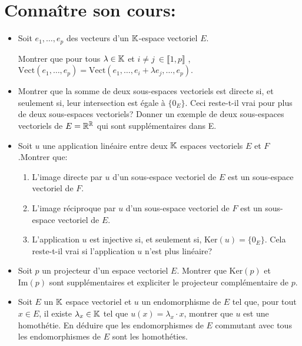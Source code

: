 \documentclass[a4paper,11pt]{article}
\theoremstyle{definition}
\begin{document}
 
 
 
 
	

\noindent{}

\smallskip
\section*{Connaître son cours:}
\begin{itemize}[$\bullet$]
	\item Soit $e_1 , \dots , e_p$ des vecteurs d’un $\mathbb{K}$-espace vectoriel $E $. 
	
	Montrer que pour tous $\lambda \in \mathbb{K}$ et $i\neq j \ \in \llbracket1, p\rrbracket$ , $\text{Vect}(e_1 ,\dots , e_p) = \text{Vect}(e_1 ,\dots , e_i + \lambda e_j , \dots, e_p) $.
	\item Montrer que la somme de deux sous-espaces vectoriels est directe si, et seulement si, leur intersection est égale à $\{0_E\} $. Ceci reste-t-il vrai pour plus de deux sous-espaces vectoriels? Donner un exemple de deux sous-espaces vectoriels de $E=\mathbb{R}^{\mathbb{R}}$ qui sont supplémentaires dans E. 
	\item Soit $u$ une application linéaire entre deux $\mathbb{K}$ espaces vectoriels $E$ et $F$.Montrer que:\begin{enumerate}[$\square$]
		\item L'image directe par $u$ d’un sous-espace vectoriel de $E$ est un sous-espace vectoriel de $F$.
		\item L'image réciproque par $u$ d’un sous-espace vectoriel de $F$ est un sous-espace vectoriel de $E$.
		\item L’application $u$ est injective si, et seulement si, $\text{Ker}(u) = \{0_E \} $. Cela reste-t-il vrai si l’application $u$ n'est plus linéaire?
	\end{enumerate} 
	\item Soit $p$ un projecteur d’un espace vectoriel $E$. Montrer que $\text{Ker}(p)$ et $\text{Im}(p)$ sont supplémentaires et expliciter le projecteur complémentaire de $p$.
	\item Soit $E$ un $\mathbb{K}$ espace vectoriel et $u$ un endomorphisme de $E$ tel que, pour tout $x \in E $, il existe $\lambda_x \in \mathbb{K}$
	tel que $u (x) = \lambda_x\cdot x $, montrer que $u$ est une homothétie. En déduire que les endomorphismes de $E$ commutant avec tous les endomorphismes de $E$
	sont les homothéties.
\end{itemize}
\end{document}
